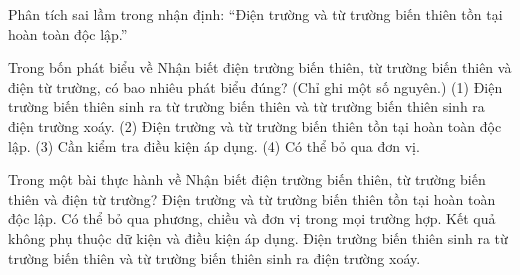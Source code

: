 \begin{bt}
Phân tích sai lầm trong nhận định: “Điện trường và từ trường biến thiên tồn tại hoàn toàn độc lập.”
\end{bt}

\begin{ex}
Trong bốn phát biểu về Nhận biết điện trường biến thiên, từ trường biến thiên và điện từ trường, có bao nhiêu phát biểu đúng? (Chỉ ghi một số nguyên.) (1) Điện trường biến thiên sinh ra từ trường biến thiên và từ trường biến thiên sinh ra điện trường xoáy. (2) Điện trường và từ trường biến thiên tồn tại hoàn toàn độc lập. (3) Cần kiểm tra điều kiện áp dụng. (4) Có thể bỏ qua đơn vị.
\end{ex}

\begin{ex}
Trong một bài thực hành về Nhận biết điện trường biến thiên, từ trường biến thiên và điện từ trường?
\choice
{Điện trường và từ trường biến thiên tồn tại hoàn toàn độc lập.}
{Có thể bỏ qua phương, chiều và đơn vị trong mọi trường hợp.}
{Kết quả không phụ thuộc dữ kiện và điều kiện áp dụng.}
{\True Điện trường biến thiên sinh ra từ trường biến thiên và từ trường biến thiên sinh ra điện trường xoáy.}
\end{ex}


